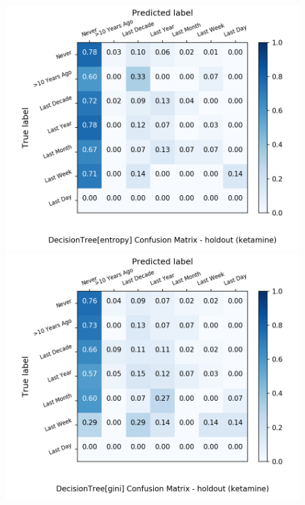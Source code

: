 \begin{figure}[H]
	\centering
	\begin{minipage}[b]{0.32\textwidth}
		\includegraphics[width=1.1\textwidth]{Plots/ketamine_DecisionTree_entropy_balance_False_holdout.png}
	\end{minipage}
	\begin{minipage}[b]{0.32\textwidth}
		\includegraphics[width=1.1\textwidth]{Plots/ketamine_DecisionTree_gini_balance_False_holdout.png}
	\end{minipage}
	\begin{minipage}[b]{0.32\textwidth}

\end{minipage}
\end{figure}
